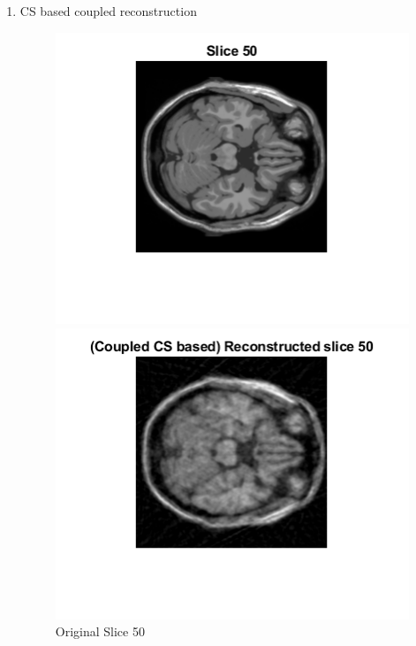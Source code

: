 \documentclass[12pt]{article}
\begin{document}
\begin{enumerate}[label = (\alph*)]
    \item CS based coupled reconstruction
    \begin{figure}[H]
        \centering
        \begin{minipage}{.45\textwidth}
            \centering
            \includegraphics[width=\linewidth]{Images/Q3_50.png}
            \caption*{Original Slice 50}
        \end{minipage}
        \begin{minipage}{.45\textwidth}
            \centering
            \includegraphics[width=\linewidth]{Images/Q3_Extra_50_c.png}

\end{minipage}
\end{figure}
\end{enumerate}
\end{document}
